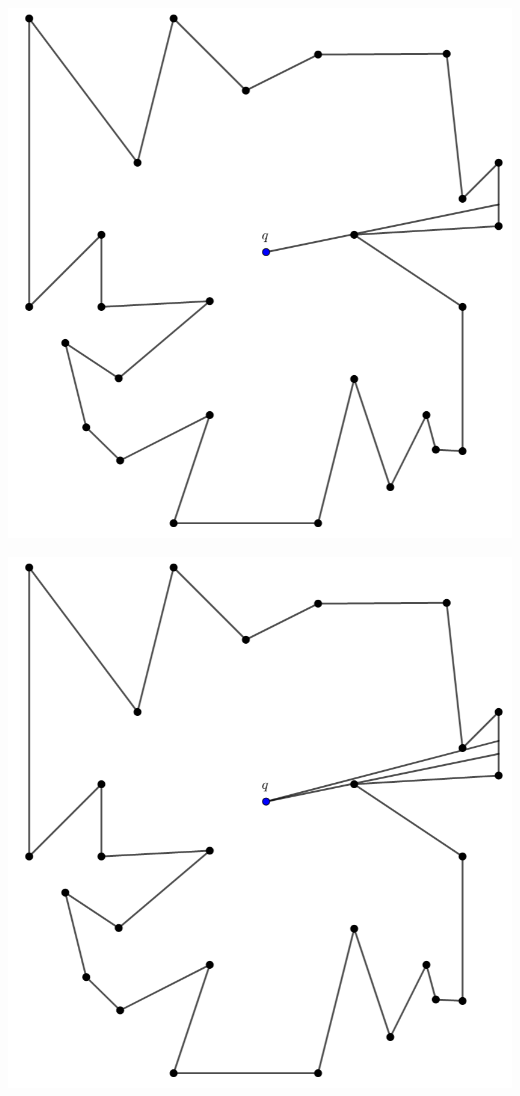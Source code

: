 {\begin{frame}
  \centering \includegraphics[width=0.55 \paperwidth]{images/V(q)05.png}
\end{frame}

\begin{frame}
  \centering \includegraphics[width=0.55 \paperwidth]{images/V(q)06.png}
\end{frame}

}
